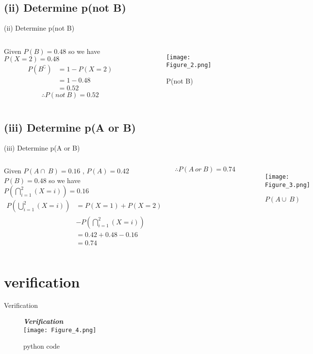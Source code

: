 \documentclass{beamer}
\newcommand{\bgunion}[3]{\bigcup_{#1}^{#2}#3}
\newcommand{\bginter}[3]{\bigcap_{#1}^{#2}#3}
\newcommand{\probunion}{P\left( \bgunion{i=1}{2}{(X=i)} \right)}
\newcommand{\probinter}{P\left( \bginter{i=1}{2}{(X=i)} \right)}
\begin{document}
\subsection{(ii) Determine p(not B)}
\begin{frame}{(ii) Determine p(not B)}
\begin{columns}

Given $P(B) = 0.48$ so we have
${P(X=2) = 0.48}$
\begin{align*}
    P(B^\complement) &= 1 - P(X=2)\\ 
                    &= 1 - 0.48\\   
                    &= 0.52
\end{align*}
\begin{equation}
 \therefore P(not\ B) = 0.52   
\end{equation}

\begin{figure}
    \centering
    \texttt{[image: Figure\_2.png]}
    \caption{P(not B)}
    \label{fig:2}
\end{figure}
\end{columns}
\end{frame}

\subsection{(iii) Determine p(A or B)}
\begin{frame}{(iii) Determine p(A or B)}\small
\begin{columns}
Given ${P(A \cap\ B) = 0.16}$ , ${P(A) = 0.42}$ 
${P(B) =0.48}$ so we have\\
${\probinter =0.16}$
\begin{align*}
    \probunion &=P(X=1) + P(X=2)\\ 
               & - \probinter \\   
                &= 0.42 + 0.48 - 0.16 \\  
                &= 0.74 
\end{align*}
\begin{center}
\begin{equation}
    \therefore P(A\ or \ B) = 0.74 
\end{equation}
\end{center}
\begin{figure}
    \centering
    \texttt{[image: Figure\_3.png]}
    \caption{$P(A \cup\ B)$}
    \label{fig:3}
\end{figure}
\end{columns}
\end{frame}

\section{verification}
\begin{frame}{Verification}
\begin{figure}
    \textbf{\textit{Verification}} \\
    \centering
    \texttt{[image: Figure\_4.png]}
    \caption*{python code}
    \label{fig_code}
\end{figure}
\end{frame}
\end{document}
